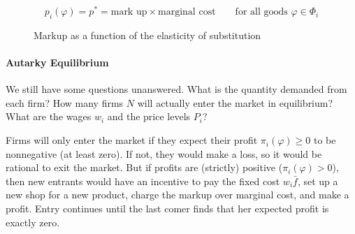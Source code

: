 \documentclass[11pt,letterpaper]{article}
\begin{document}
\begin{equation*}
    \boxed{
    p_i(\varphi) = p^* = \text{mark up} \times \text{marginal cost} \qquad \text{for all goods } \varphi \in \Phi_i
    }
\end{equation*}


    \begin{figure}[htp]
        \centering
            \caption{Markup as a function of the elasticity of substitution}
        \label{fig: ces-markup}
    \end{figure}

\newpage


\paragraph{Autarky Equilibrium} We still have some questions unanswered. What is the quantity demanded from each firm? How many firms $N$ will actually enter the market in equilibrium? What are the wages $w_i$ and the price levels $P_i$?

Firms will only enter the market if they expect their profit $\pi_i(\varphi) \ge0$ to be nonnegative (at least zero). If not, they would make a loss, so it would be rational to exit the market. But if profits are (strictly) positive ($\pi_i(\varphi) >0$), then new entrants would have an incentive to pay the fixed cost $w_i \bar{f}$, set up a new shop for a new product, charge the markup over marginal cost, and make a profit. Entry continues until the last comer finds that her expected profit is exactly zero.
\end{document}
